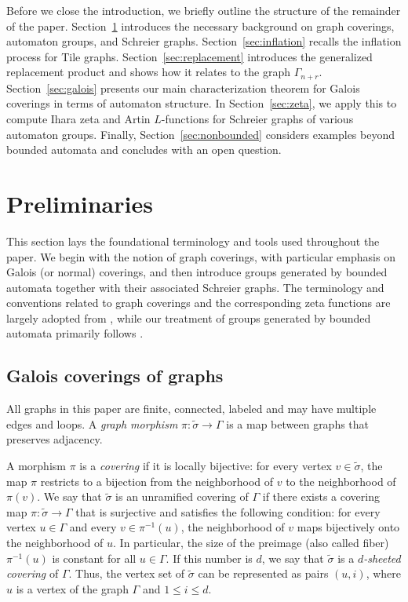 \documentclass{article}
\newcommand{\G}{\Gamma}
\newcommand{\tG}{\widetilde{\sigma}}
\begin{document}
Before we close the introduction, we briefly outline the structure of the remainder of the paper. Section~\ref{sec:preliminaries} introduces the necessary background on graph coverings, automaton groups, and Schreier graphs. Section~\ref{sec:inflation} recalls the inflation process for Tile graphs. Section~\ref{sec:replacement} introduces the generalized replacement product and shows how it relates to the graph $\G_{n+r}$. Section~\ref{sec:galois} presents our main characterization theorem for Galois coverings in terms of automaton structure. In Section~\ref{sec:zeta}, we apply this to compute Ihara zeta and Artin $L$-functions for Schreier graphs of various automaton groups. Finally, Section~\ref{sec:nonbounded} considers examples beyond bounded automata and concludes with an open question.

\section{Preliminaries}\label{sec:preliminaries}

This section lays the foundational terminology and tools used throughout the paper. We begin with the notion of graph coverings, with particular emphasis on Galois (or normal) coverings, and then introduce groups generated by bounded automata together with their associated Schreier graphs. The terminology and conventions related to graph coverings and the corresponding zeta functions are largely adopted from \cite{terras2010zeta}, while our treatment of groups generated by bounded automata primarily follows \cite{bondarenko2007groups,bondarenko2016ends}.

\subsection{Galois coverings of graphs}

All graphs in this paper are finite, connected, labeled and may have multiple edges and loops. A \emph{graph morphism} $\pi: \tG \to \G$ is a map between graphs that preserves adjacency.

A morphism $\pi$ is a \emph{covering} if it is locally bijective: for every vertex $v \in \tG$, the map $\pi$ restricts to a bijection from the neighborhood of $v$ to the neighborhood of $\pi(v)$. We say that $\tG$ is an unramified covering of $\G$ if there exists a covering map $\pi: \tG \to \G$ that is surjective and satisfies the following condition: for every vertex $u \in \G$ and every $v \in \pi^{-1}(u)$, the neighborhood of $v$ maps bijectively onto the neighborhood of $u$. In particular, the size of the preimage (also called fiber) $\pi^{-1}(u)$ is constant for all $u \in \G$. If this number is $d$, we say that $\tG$ is a \emph{$d$-sheeted covering} of $\G$. Thus, the vertex set of $\tG$ can be represented as pairs $(u, i)$, where $u$ is a vertex of the graph $\G$ and $1 \leq i \leq d$.
\end{document}
